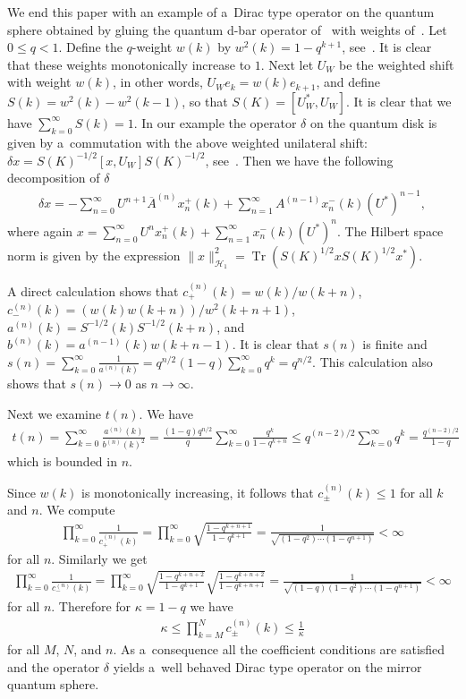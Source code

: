 \documentclass[pdftex]{sigma}
\numberwithin{equation}{section}
\begin{document}
We end this paper with an example of a~Dirac type operator on the quantum sphere obtained by gluing the quantum d-bar
operator of~\cite{KM1} with weights of~\cite{KL1}.
Let $0\le q <1$.
Def\/ine the $q$-weight $w(k)$ by $w^2(k) = 1 - q^{k+1}$, see~\cite{KL1}.
It is clear that these weights monotonically increase to $1$.
Next let $U_W$ be the weighted shift with weight $w(k)$, in other words, $U_We_k = w(k)e_{k+1}$, and def\/ine $S(k) =
w^2(k) - w^2(k-1)$, so that $S(K)=[U_W^*,U_W]$.
It is clear that we have $\sum\limits_{k=0}^\infty S(k) = 1$.
In our example the operator $\delta$ on the quantum disk is given by a~commutation with the above weighted unilateral
shift: $\delta x = S(K)^{-1/2}[x,U_W]S(K)^{-1/2}$, see~\cite{KM1}.
Then we have the following decomposition of $\delta$
\begin{gather*}
\delta x = -\sum\limits_{n=0}^\infty U^{n+1}\overline{A}^{(n)}x^+_n(k) + \sum\limits_{n=1}^\infty
A^{(n-1)}x^-_n(k)(U^*)^{n-1},
\end{gather*}
where again $x = \sum\limits_{n=0}^\infty U^n x^+_n(k) + \sum\limits_{n=1}^\infty x^-_n(k)(U^*)^n$.
The Hilbert space norm is given by the expression
$\|x\|_{\mathcal{H}_1}^2={{\operatorname{Tr}}}\left(S(K)^{1/2}xS(K)^{1/2}x^*\right)$.

A direct calculation shows that $c_+^{(n)}(k) = w(k)/w(k+n)$, $c_-^{(n)}(k) = (w(k)w(k+n))/w^2(k+n+1)$, $a^{(n)}(k) =
S^{-1/2}(k)S^{-1/2}(k+n)$, and $b^{(n)}(k) = a^{(n-1)}(k)w(k+n-1)$.
It is clear that $s(n)$ is f\/inite and $s(n) = \sum\limits_{k=0}^\infty \frac{1}{a^{(n)}(k)} =
q^{n/2}(1-q)\sum\limits_{k=0}^\infty q^k = q^{n/2}$.
This calculation also shows that $s(n)\to 0$ as $n\to\infty$.

Next we examine $t(n)$.
We have
\begin{gather*}
t(n) = \sum\limits_{k=0}^\infty \frac{a^{(n)}(k)}{b^{(n)}(k)^2} = \frac{(1-q)q^{n/2}}{q}\sum\limits_{k=0}^\infty
\frac{q^k}{1-q^{k+n}} \le q^{(n-2)/2}\sum\limits_{k=0}^\infty q^k = \frac{q^{(n-2)/2}}{1-q}
\end{gather*}
which is bounded in $n$.

Since $w(k)$ is monotonically increasing, it follows that $c_{\pm}^{(n)}(k)\le 1$ for all $k$ and $n$.
We compute
\begin{gather*}
\prod\limits_{k=0}^\infty \frac{1}{c_+^{(n)}(k)} = \prod\limits_{k=0}^\infty \sqrt{\frac{1-q^{k+n+1}}{1-q^{k+1}}} =
\frac{1}{\sqrt{(1-q^2)\cdots(1-q^{n+1})}} < \infty
\end{gather*}
for all $n$.
Similarly we get
\begin{gather*}
\prod\limits_{k=0}^\infty \frac{1}{c_-^{(n)}(k)} = \prod\limits_{k=0}^\infty \sqrt{\frac{1-q^{k+n+2}}{1-q^{k+1}}}
\sqrt{\frac{1-q^{k+n+2}}{1-q^{k+n+1}}} = \frac{1}{\sqrt{(1-q)(1-q^2)\cdots(1-q^{n+1})}} < \infty
\end{gather*}
for all $n$.
Therefore for $\kappa=1-q$ we have
\begin{gather*}
\kappa \le \prod\limits_{k=M}^N c_{\pm}^{(n)}(k) \le \frac{1}{\kappa}
\end{gather*}
for all $M$, $N$, and $n$.
As a~consequence all the coef\/f\/icient conditions are satisf\/ied and the operator $\delta$ yields a~well behaved Dirac type
operator on the mirror quantum sphere.
\end{document}
